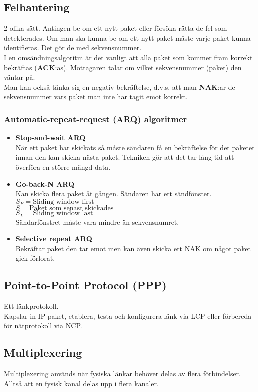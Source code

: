 \documentclass[11pt]{article}
\begin{document}
\subsection{Felhantering}
2 olika sätt. Antingen be om ett nytt paket eller försöka rätta de fel som detekterades. Om man ska kunna be om ett nytt paket måste varje paket kunna identifieras. Det gör de med sekvensnummer. \\
I en omsändningsalgoritm är det vanligt att alla paket som kommer fram korrekt bekräftas (\textbf{ACK}:as). Mottagaren talar om vilket sekvensnummer (paket) den väntar på. \\
Man kan också tänka sig en negativ bekräftelse, d.v.s. att man \textbf{NAK}:ar de sekvensnummer vars paket man inte har tagit emot korrekt.  
\subsubsection{Automatic-repeat-request (ARQ) algoritmer}
\begin{itemize}
\item{\textbf{Stop-and-wait ARQ} \\
När ett paket har skickats så måste sändaren få en bekräftelse för det paketet innan den kan skicka nästa paket. Tekniken gör att det tar lång tid att överföra en större mängd data.}
\item{\textbf{Go-back-N ARQ} \\
	Kan skicka flera paket åt gången. Sändaren har ett sändfönster. \\
	$S_F = \text{Sliding window first} $ \\
	$S = \text{Paket som senast skickades} $\\
	$S_L = \text{Sliding window last} $ \\
	Sändarfönstret måste vara mindre än sekvensnumret.}
\item{\textbf{Selective repeat ARQ} \\
	Bekräftar paket den tar emot men kan även skicka ett NAK om något paket gick förlorat.}
\end{itemize}
\subsection{Point-to-Point Protocol (PPP)}
Ett länkprotokoll. \\
Kapslar in IP-paket, etablera, testa och konfigurera länk via LCP eller förbereda för nätprotokoll via NCP.

\subsection{Multiplexering}
Multiplexering används när fysiska länkar behöver delas av flera förbindelser. Alltså att en fysisk kanal delas upp i flera kanaler. 
\end{document}
